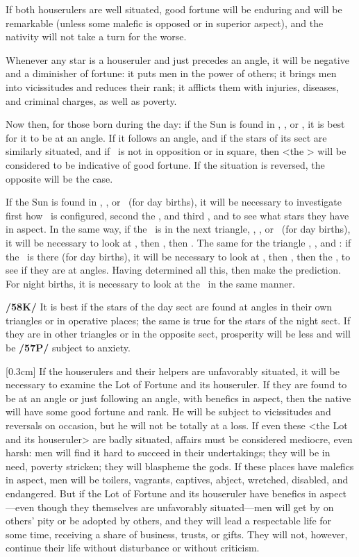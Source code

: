 If both houserulers are well situated, good fortune will be enduring and will be remarkable (unless some malefic is opposed or in superior aspect), and the nativity will not take a turn for the worse. 

Whenever any star is a houseruler and just precedes an angle, it will be negative and a diminisher of fortune: it puts men in the power of others; it brings men into vicissitudes and reduces their rank; it afflicts them with injuries, diseases, and criminal charges, as well as poverty.

Now then, for those born during the day: if the Sun is found in \Aries, \Leo, or \Sagittarius, it is best for it to be at an angle. If it follows an angle, and if the stars of its sect are similarly situated, and if \Mars\, is not in opposition or in square, then <the \Sun> will be considered to be indicative of good fortune. If the situation is reversed, the opposite will be the case. 

If the Sun is found in \Taurus, \Virgo, or \Capricorn\, (for day births), it will be necessary to investigate first how \Venus\, is configured, second the \Moon, and third
\Mars, and to see what stars they have in aspect. In the same way, if the \Sun\, is in the next triangle, \Gemini, \Libra, or \Aquarius\, (for day births), it will be necessary to look at \Saturn, then \Mercury, then \Jupiter. The same for the triangle \Cancer, \Scorpio, and \Pisces: if the \Sun\, is there (for day births), it will be necessary to look at \Venus, then \Mars, then the \Moon, to see if they are at angles. Having determined all this, then make the prediction. For night births, it is necessary to look at the \Moon\, in the same manner.

\mndl[0.2cm]
\textbf{/58K/} It is best if the stars of the day sect are found at angles in their own triangles or in operative
places; the same is true for the stars of the night sect. If they are in other triangles or in the opposite sect, prosperity will be less and will be \textbf{/57P/} subject to anxiety. 

\marginnote{\Fortune}[0.3cm]
If the houserulers and their helpers are unfavorably situated, it will be necessary to examine the Lot of Fortune and its houseruler. If they are found to be at an angle or just following an angle, with benefics in aspect, then the native will have some good fortune and rank. He will be subject to vicissitudes and reversals on occasion, but he will not be
totally at a loss. If even these <the Lot and its houseruler> are badly situated, affairs must be considered
mediocre, even harsh: men will find it hard to succeed in their undertakings; they will be in need, poverty stricken;
they will blaspheme the gods. If these places have malefics in aspect, men will be toilers, vagrants, captives, abject, wretched, disabled, and endangered. But if the Lot of Fortune and its houseruler have benefics in aspect—even though they themselves are unfavorably situated—men will get by on others’
pity or be adopted by others, and they will lead a respectable life for some time, receiving a share of business, trusts, or gifts. They will not, however, continue their life without disturbance or without criticism.


